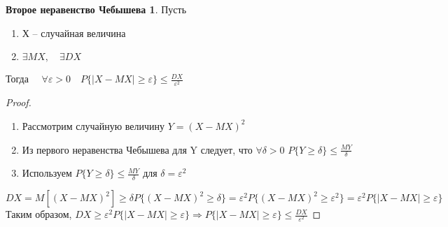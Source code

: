 \documentclass[a4paper, 12pt]{article}
\theoremstyle{definition}
\theoremstyle{leads}
\theoremstyle{example}
\begin{document}
\newtheorem*{cheb2}{Второе неравенство Чебышева}
\begin{cheb2}
	 Пусть
	\begin{enumerate}
		\item Х -- случайная величина
		\item $\exists MX, \quad \exists DX$
	\end{enumerate}
Тогда $\quad \forall \varepsilon > 0 \quad P\{|X - MX| \geq \varepsilon\} \leq \frac{DX}{\varepsilon^2}$
\end{cheb2}
\begin{proof}
	\begin{enumerate}
		\item Рассмотрим случайную величину $Y = (X - MX)^2$
		\item Из первого неравенства Чебышева для  Y следует, что $\forall \delta > 0$ $P \{ Y \geq \delta\} \leq \frac{MY}{\delta}$
		\item Используем $P \{ Y \geq \delta\} \leq \frac{MY}{\delta}$ для $\delta = \varepsilon^2$
	\end{enumerate}
	\begin{displaymath}
		DX = M[(X - MX)^2] \geq \delta P\{(X - MX)^2 \geq \delta\} = \varepsilon^2 P\{(X - MX)^2 \geq \varepsilon^2\} = \varepsilon^2 P\{|X - MX| \geq \varepsilon\}
	\end{displaymath}
	Таким образом, $DX \geq \varepsilon^2 P\{|X - MX| \geq \varepsilon\} \Longrightarrow P\{|X - MX|\geq \varepsilon\} \leq \frac{DX}{\varepsilon^2}$
\end{proof}
\end{document}
